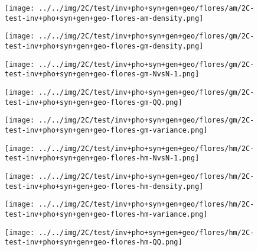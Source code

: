 \begin{figure}[H]
\centering	\texttt{[image: ../../img/2C/test/inv+pho+syn+gen+geo/flores/am/2C-test-inv+pho+syn+gen+geo-flores-am-density.png]}
\end{figure}
\begin{figure}[H]
\centering	\texttt{[image: ../../img/2C/test/inv+pho+syn+gen+geo/flores/gm/2C-test-inv+pho+syn+gen+geo-flores-gm-density.png]}
\end{figure}
\begin{figure}[H]
\centering	\texttt{[image: ../../img/2C/test/inv+pho+syn+gen+geo/flores/gm/2C-test-inv+pho+syn+gen+geo-flores-gm-NvsN-1.png]}
\end{figure}
\begin{figure}[H]
\centering	\texttt{[image: ../../img/2C/test/inv+pho+syn+gen+geo/flores/gm/2C-test-inv+pho+syn+gen+geo-flores-gm-QQ.png]}
\end{figure}
\begin{figure}[H]
\centering	\texttt{[image: ../../img/2C/test/inv+pho+syn+gen+geo/flores/gm/2C-test-inv+pho+syn+gen+geo-flores-gm-variance.png]}
\end{figure}
\begin{figure}[H]
\centering	\texttt{[image: ../../img/2C/test/inv+pho+syn+gen+geo/flores/hm/2C-test-inv+pho+syn+gen+geo-flores-hm-NvsN-1.png]}
\end{figure}
\begin{figure}[H]
\centering	\texttt{[image: ../../img/2C/test/inv+pho+syn+gen+geo/flores/hm/2C-test-inv+pho+syn+gen+geo-flores-hm-density.png]}
\end{figure}
\begin{figure}[H]
\centering	\texttt{[image: ../../img/2C/test/inv+pho+syn+gen+geo/flores/hm/2C-test-inv+pho+syn+gen+geo-flores-hm-variance.png]}
\end{figure}
\begin{figure}[H]
\centering	\texttt{[image: ../../img/2C/test/inv+pho+syn+gen+geo/flores/hm/2C-test-inv+pho+syn+gen+geo-flores-hm-QQ.png]}
\end{figure}
